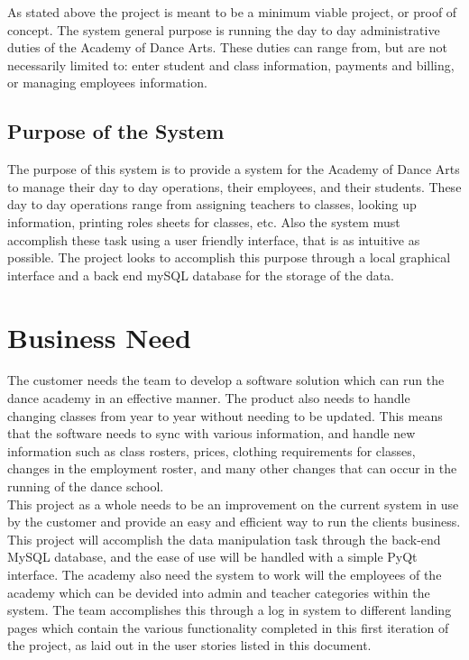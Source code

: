 As stated above the project is meant to be a minimum viable project, or proof of concept. The system general purpose is running the day to day administrative duties of the Academy of Dance Arts. These duties can range from, but are not necessarily limited to: enter student and class information, payments and billing, or managing employees information. 

\subsection{Purpose of the System}
The purpose of this system is to provide a system for the Academy of Dance Arts to manage their day to day operations, their employees, and their students. These day to day operations range from assigning teachers to classes, looking up information, printing roles sheets for classes, etc.  Also the system must accomplish these task using a user friendly interface, that is as intuitive as possible. The project looks to accomplish this purpose through a local graphical interface and a back end mySQL database for the storage of the data.


\section{Business Need}
The customer needs the team to develop a software solution which can run the dance academy in an effective manner. The product also needs to handle changing classes from year to year without needing to be updated. This means that the software needs to sync with various information, and handle new information such as class rosters, prices, clothing requirements for classes, changes in the employment roster, and many other changes that can occur in the running of the dance school.\\
This project as a whole needs to be an improvement on the current system in use by the customer and provide an easy and efficient way to run the clients business. This project will accomplish the data manipulation task through the back-end MySQL database, and the ease of use will be handled with a simple PyQt interface.
The academy also need the system to work will the employees of the academy which can be devided into admin and teacher categories within the system. The team accomplishes this through a log in system to different landing pages which contain the various functionality completed in this first iteration of the project, as laid out in the user stories listed in this document.
   

